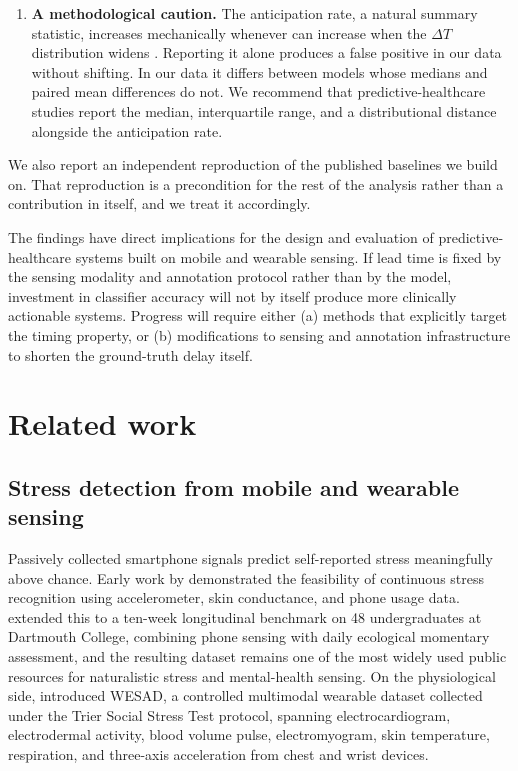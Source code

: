 \documentclass[preprint,12pt,authoryear]{elsarticle}
\newcommand{\dt}{$\Delta T$}
\providecommand{\DIFaddtex}[1]{{\protect\color{blue} \sf #1}} %
\providecommand{\DIFdeltex}[1]{{\protect\color{red} \scriptsize #1}} %
\providecommand{\DIFaddbegin}{} %
\providecommand{\DIFaddend}{} %
\providecommand{\DIFdelbegin}{} %
\providecommand{\DIFdelend}{} %
\providecommand{\DIFadd}[1]{\texorpdfstring{\DIFaddtex{#1}}{#1}} %
\providecommand{\DIFdel}[1]{\texorpdfstring{\DIFdeltex{#1}}{}} %
\newcommand{\DIFscaledelfig}{0.5}
\newlength{\DIFdelgraphicswidth} %
\newlength{\DIFdelgraphicsheight} %
\newcommand{\DIFaddincludegraphics}[2][]{{\color{blue}\fbox{\DIFOincludegraphics[#1]{#2}}}} %
\newcommand{\DIFdelincludegraphics}[2][]{%
\sbox{\DIFdelgraphicsbox}{\DIFOincludegraphics[#1]{#2}}%
\settoboxwidth{\DIFdelgraphicswidth}{\DIFdelgraphicsbox} %
\settoboxtotalheight{\DIFdelgraphicsheight}{\DIFdelgraphicsbox} %
\scalebox{\DIFscaledelfig}{%
\parbox[b]{\DIFdelgraphicswidth}{\usebox{\DIFdelgraphicsbox}\\[-\baselineskip] \rule{\DIFdelgraphicswidth}{0em}}\llap{\resizebox{\DIFdelgraphicswidth}{\DIFdelgraphicsheight}{%
\setlength{\unitlength}{\DIFdelgraphicswidth}%
\begin{picture}(1,1)%
\thicklines\linethickness{2pt} %
{\color[rgb]{1,0,0}\put(0,0){\framebox(1,1){}}}%
{\color[rgb]{1,0,0}\put(0,0){\line( 1,1){1}}}%
{\color[rgb]{1,0,0}\put(0,1){\line(1,-1){1}}}%
\end{picture}%
}\hspace*{3pt}}} %
} %
\DeclareRobustCommand{\DIFaddbegin}{\DIFOaddbegin \let\includegraphics\DIFaddincludegraphics} %
\DeclareRobustCommand{\DIFaddend}{\DIFOaddend \let\includegraphics\DIFOincludegraphics} %
\DeclareRobustCommand{\DIFdelbegin}{\DIFOdelbegin \let\includegraphics\DIFdelincludegraphics} %
\DeclareRobustCommand{\DIFdelend}{\DIFOaddend \let\includegraphics\DIFOincludegraphics} %
\begin{document}
\begin{enumerate}
\item \textbf{A methodological caution.} The anticipation rate, a
natural summary statistic, \DIFdelbegin \DIFdel{increases mechanically whenever }\DIFdelend \DIFaddbegin \DIFadd{can increase when }\DIFaddend the \dt{} distribution
widens \DIFdelbegin \DIFdel{. Reporting it alone produces a false positive in
our data }\DIFdelend \DIFaddbegin \DIFadd{without shifting. In our data it differs between models whose
medians and paired mean differences do not}\DIFaddend . We recommend that predictive-healthcare studies report the
median, interquartile range, and a distributional distance alongside
the anticipation rate.

\end{enumerate}

We also report an independent reproduction of the published baselines
we build on. That reproduction is a precondition for the rest of the
analysis rather than a contribution in itself, and we treat it
accordingly.

The findings have direct implications for the design and evaluation of
predictive-healthcare systems built on mobile and wearable sensing. If
lead time is fixed by the sensing modality and annotation protocol
rather than by the model, investment in classifier accuracy will not
by itself produce more clinically actionable systems. Progress will
require either (a) methods that explicitly target the timing property,
or (b) modifications to sensing and annotation infrastructure to
shorten the ground-truth delay itself.

\section{Related work}

\subsection{Stress detection from mobile and wearable sensing}

Passively collected smartphone signals predict self-reported stress
meaningfully above chance. Early work by
\citet{sano2013} demonstrated the feasibility of continuous stress
recognition using accelerometer, skin conductance, and phone usage
data. \citet{wang2014} extended this to a ten-week longitudinal
benchmark on 48 undergraduates at Dartmouth College, combining phone
sensing with daily ecological momentary assessment, and the resulting
dataset remains one of the most widely used public resources for
naturalistic stress and mental-health sensing. On the physiological
side, \citet{schmidt2018} introduced WESAD, a controlled multimodal
wearable dataset collected under the Trier Social Stress Test protocol,
spanning electrocardiogram, electrodermal activity, blood volume pulse,
electromyogram, skin temperature, respiration, and three-axis
acceleration from chest and wrist devices.
\end{document}
